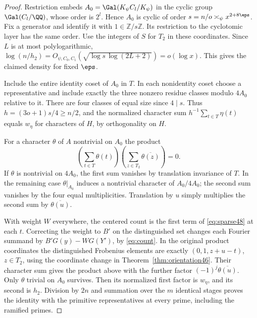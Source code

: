 \documentclass[a4paper,11pt]{article}
\theoremstyle{definition}
\theoremstyle{remark}
\newcommand{\ZZ}{\mathbb Z}\newcommand{\ord}{\operatorname{ord}}
\numberwithin{equation}{section}
\begin{document}
\begin{proof}
Restriction embeds \(A_0=\Gal(K_\psi C_l/K_\psi)\) in the cyclic
group \(\Gal(C_l/\QQ)\), whose order is \(2^l\). Hence \(A_0\) is
cyclic of order \(s=n/o\asymp_\psi x^{2+8\eps}\). Fix a generator
and identify it with \(1\in\ZZ/s\ZZ\). Its restriction to the
cyclotomic layer has the same order. Use the integers of \(S\) for
\(T_2\) in these coordinates. Since \(L\) is at most polylogarithmic,
\(\log(n/h_2)=O_{\psi,C_0,C_1}(\sqrt{\log s\,\log(2L+2)})=o(\log x)\).
This gives the claimed density for fixed \(\eps\).

Include the entire identity coset of \(A_0\) in \(T\). In each
nonidentity coset choose a representative and include exactly the
three nonzero residue classes modulo \(4A_0\) relative to it.
There are four classes of equal size since \(4\mid s\). Thus
\(h=(3o+1)s/4\ge n/2\), and the normalized character sum
\(h^{-1}\sum_{t\in T}\eta(t)\) equals \(w_\eta\) for characters of
\(H\), by orthogonality on \(H\).

For a character \(\theta\) of \(A\) nontrivial on \(A_0\) the product
\[
 \left(\sum_{t\in T}\theta(t)\right)
 \left(\sum_{z\in T_2}\overline{\theta(z)}\right)=0.
\]
If \(\theta\) is nontrivial on \(4A_0\), the first sum vanishes by
translation invariance of \(T\). In the remaining case
\(\theta|_{A_0}\) induces a nontrivial character of \(A_0/4A_0\);
the second sum vanishes by the four equal multiplicities. Translation
by \(u\) simply multiplies the second sum by \(\overline{\theta(u)}\).

With weight \(W\) everywhere, the centered count is the first term
of \eqref{eq:sparse48} at each \(t\). Correcting the weight to \(B'\)
on the distinguished set changes each Fourier summand by
\(B'G(y)-W G(Y')\), by \eqref{eq:count}. In the original product
coordinates the distinguished Frobenius elements are exactly
\((0,1,z+u-t)\), \(z\in T_2\), using the coordinate change in
Theorem~\ref{thm:orientation46}. Their character sum gives the product
above with the further factor \((-1)^j\overline{\theta(u)}\).
Only \(\theta\) trivial on \(A_0\) survives. Then its normalized
first factor is \(w_\eta\), and its second is \(h_2\). Division by
\(2n\) and summation over the \(m\) identical stages proves the
identity with the primitive representatives at every prime, including
the ramified primes.
\end{proof}
\end{document}
